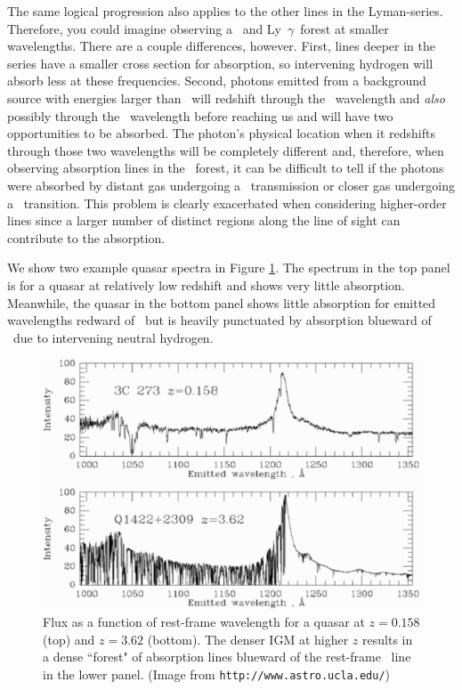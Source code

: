 The same logical progression also applies to the other lines in the Lyman-series. Therefore, you could imagine observing a \lyb\ and Ly\ $\gamma$\ forest at smaller wavelengths. There are a couple differences, however. First, lines deeper in the series have a smaller cross section for absorption, so intervening hydrogen will absorb less at these frequencies. Second, photons emitted from a background source with energies larger than \lyb\ will redshift through the \lyb\ wavelength and \textit{also} possibly through the \lya\ wavelength before reaching us and will have two opportunities to be absorbed. The photon's physical location when it redshifts through those two wavelengths will be completely different and, therefore, when observing absorption lines in the \lyb\ forest, it can be difficult to tell if the photons were absorbed by distant gas undergoing a \lyb\ transmission or closer gas undergoing a \lya\ transition. This problem is clearly exacerbated when considering higher-order lines since a larger number of distinct regions along the line of sight can contribute to the absorption.


We show two example quasar spectra in Figure \ref{fig:LyaExample}. The spectrum in the top panel is for a quasar at relatively low redshift and shows very little absorption. Meanwhile, the quasar in the bottom panel shows little absorption for emitted wavelengths redward of \lya\ but is heavily punctuated by absorption blueward of \lya\ due to intervening neutral hydrogen.
 
\begin{figure}[!p]
  \centering
  \includegraphics[width=12cm]{Lya-forest-60.eps}
  \caption{Flux as a function of rest-frame wavelength for a quasar at $z = 0.158$ (top) and $z = 3.62$ (bottom). The denser IGM at higher $z$ results in a dense ``forest" of absorption lines blueward of the rest-frame \lya\ line in the lower panel. (Image from {\tt http://www.astro.ucla.edu/})}
  \label{fig:LyaExample}
\end{figure}

